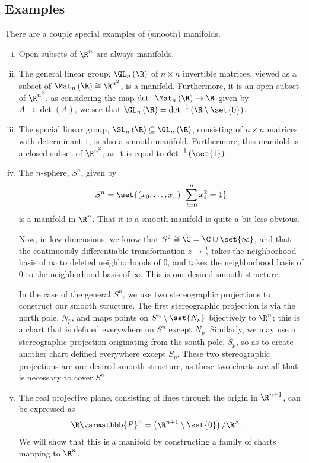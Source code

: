 \documentclass[10pt]{mypackage}
\renewcommand*{\mathbb}[1]{\varmathbb{#1}}
\begin{document}
\subsection{Examples}%
There are a couple special examples of (smooth) manifolds.
\begin{enumerate}[(i)]
  \item Open subsets of $\R^n$ are always manifolds.
  \item The general linear group, $\GL_n\left( \R \right)$ of $n\times n$ invertible matrices, viewed as a subset of $\Mat_{n}\left( \R \right)\cong \R^{n^2}$, is a manifold. Furthermore, it is an open subset of $\R^{n^2}$, as considering the map $\det\colon \Mat_{n}\left( \R \right)\rightarrow \R$ given by $A\mapsto \det\left( A \right)$, we see that $\GL_{n}\left( \R \right) = \det^{-1}\left( \R\setminus \set{0} \right)$.
  \item The special linear group, $\SL_n\left( \R \right)\subseteq \GL_n\left( \R \right)$, consisting of $n\times n$ matrices with determinant $1$, is also a smooth manifold. Furthermore, this manifold is a closed subset of $\R^{n^2}$, as it is equal to $\det^{-1}\left( \set{1} \right)$.
  \item The $n$-sphere, $S^{n}$, given by
    \begin{align*}
      S^{n} = \set{\left( x_0,\dots,x_n \right) | \sum_{i=0}^{n}x_i^2 = 1}
    \end{align*}
    is a manifold in $\R^{n}$. That it is a smooth manifold is quite a bit less obvious.\newline

    Now, in low dimensions, we know that $S^{2} \cong \hat{\C} = \C\cup\set{\infty}$, and that the continuously differentiable transformation $z\mapsto \frac{1}{z}$ takes the neighborhood basis of $\infty$ to deleted neighborhoods of $0$, and takes the neighborhood basis of $0$ to the neighborhood basis of $\infty$. This is our desired smooth structure.\newline

    In the case of the general $S^{n}$, we use two stereographic projections to construct our smooth structure. The first stereographic projection is via the north pole, $N_{p}$, and maps points on $S^{n}\setminus \set{N_{p}}$ bijectively to $\R^{n}$; this is a chart that is defined everywhere on $S^{n}$ except $N_{p}$. Similarly, we may use a stereographic projection originating from the south pole, $S_{p}$, so as to create another chart defined everywhere except $S_{p}$. These two stereographic projections are our desired smooth structure, as these two charts are all that is necessary to cover $S^{n}$.
  \item The real projective plane, consisting of lines through the origin in $\R^{n+1}$, can be expressed as
    \begin{align*}
      \R\mathbb{P}^{n} &= \left( \R^{n+1}\setminus \set{0} \right)/\R^{\times}.
    \end{align*}
    We will show that this is a manifold by constructing a family of charts mapping to $\R^{n}$.\newline


\end{enumerate}
\end{document}
